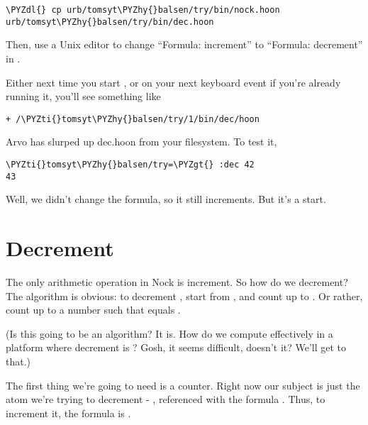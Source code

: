 \begin{framed_shaded}
\begin{Verbatim}[fontsize=\relsize{-2.5},fontseries=b,commandchars=\\\{\}]
\PYZdl{} cp urb/tomsyt\PYZhy{}balsen/try/bin/nock.hoon urb/tomsyt\PYZhy{}balsen/try/bin/dec.hoon
\end{Verbatim}
\end{framed_shaded}
Then, use a Unix editor to change ``Formula: increment'' to
``Formula: decrement'' in .

Either next time you start , or on your next keyboard event
if you're already running it, you'll see something like

\begin{framed_shaded}
\begin{Verbatim}[fontsize=\relsize{-2.5},fontseries=b,commandchars=\\\{\}]
 + /\PYZti{}tomsyt\PYZhy{}balsen/try/1/bin/dec/hoon
\end{Verbatim}
\end{framed_shaded}
Arvo has slurped up dec.hoon from your filesystem.  To test it,

\begin{framed_shaded}
\begin{Verbatim}[fontsize=\relsize{-2.5},fontseries=b,commandchars=\\\{\}]
\PYZti{}tomsyt\PYZhy{}balsen/try=\PYZgt{} :dec 42
43
\end{Verbatim}
\end{framed_shaded}
Well, we didn't change the formula, so it still increments.  But
it's a start.

\section{Decrement}

The only arithmetic operation in Nock is increment.  So how do we
decrement?  The algorithm is obvious: to decrement , start
from , and count up to .  Or rather, count up to a number
 such that  equals .

(Is this going to be an  algorithm?  It is.  How do we
compute effectively in a platform where decrement is ?
Gosh, it seems difficult, doesn't it?  We'll get to that.)

The first thing we're going to need is a counter.  Right now
our subject is just the atom we're trying to decrement - ,
referenced with the formula \kode{[0 1]}.  Thus, to increment it,
the formula is \kode{[4 0 1]}.

